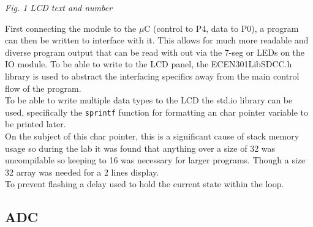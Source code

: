 \documentclass[11pt]{article}
\begin{document}
\begin{preview}
\begin{center}
                \textit{Fig. 1 LCD text and number}
        \end{center}

        First connecting the module to the $\mu$C (control to P4, data to P0), a program can then be written to interface with it. This allows for much more readable and diverse program output that can be read with out via the 7-seg or LEDs on the IO module. To be able to write to the LCD panel, the ECEN301LibSDCC.h library is used to abstract the interfacing specifics away from the main control flow of the program. \\

        To be able to write multiple data types to the LCD the std.io library can be used, specifically the \texttt{sprintf} function for formatting an char pointer variable to be printed later. \\

        On the subject of this char pointer, this is a significant cause of stack memory usage so during the lab it was found that anything over a size of 32 was uncompilable so keeping to 16 was necessary for larger programs. Though a size 32 array was needed for a 2 lines display. \\
        
        To prevent flashing a delay used to hold the current state within the loop.
        

        \subsection{ADC}
        \begin{center}


\end{center}
\end{preview}
\end{document}
